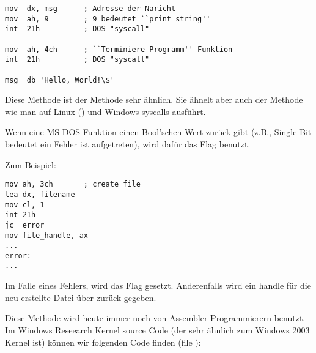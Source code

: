 \begin{lstlisting}[style=customasmx86]
mov  dx, msg      ; Adresse der Naricht
mov  ah, 9        ; 9 bedeutet ``print string''
int  21h          ; DOS "syscall"

mov  ah, 4ch      ; ``Terminiere Programm'' Funktion
int  21h          ; DOS "syscall"

msg  db 'Hello, World!\$' 
\end{lstlisting}

Diese Methode ist der  Methode sehr ähnlich. Sie ähnelt aber auch der Methode
wie man auf Linux () und Windows syscalls ausführt.

Wenn eine MS-DOS Funktion einen Bool'schen Wert zurück gibt (z.B., Single Bit bedeutet ein Fehler ist aufgetreten), wird dafür das  Flag benutzt.

Zum Beispiel:

\begin{lstlisting}[style=customasmx86]
mov ah, 3ch       ; create file
lea dx, filename
mov cl, 1
int 21h
jc  error
mov file_handle, ax
...
error:
...
\end{lstlisting}

Im Falle eines Fehlers, wird das  Flag gesetzt. Anderenfalls wird ein handle für die neu erstellte Datei über  zurück gegeben. 


Diese Methode wird heute immer noch von Assembler Programmierern benutzt.
Im Windows Reseearch Kernel source Code (der sehr ähnlich zum Windows 2003 Kernel ist) können wir folgenden Code
finden (file ):

